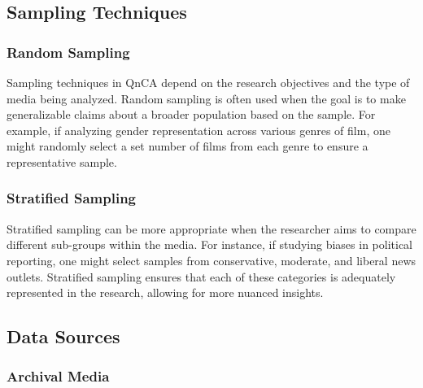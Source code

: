 \documentclass[
  b5paper]{book}
\begin{document}
\hypertarget{sampling-techniques}{%
\subsection*{Sampling Techniques}\label{sampling-techniques}}

\hypertarget{random-sampling}{%
\subsubsection*{Random Sampling}\label{random-sampling}}

Sampling techniques in QnCA depend on the research objectives and the type of media being analyzed. Random sampling is often used when the goal is to make generalizable claims about a broader population based on the sample. For example, if analyzing gender representation across various genres of film, one might randomly select a set number of films from each genre to ensure a representative sample.

\hypertarget{stratified-sampling}{%
\subsubsection*{Stratified Sampling}\label{stratified-sampling}}

Stratified sampling can be more appropriate when the researcher aims to compare different sub-groups within the media. For instance, if studying biases in political reporting, one might select samples from conservative, moderate, and liberal news outlets. Stratified sampling ensures that each of these categories is adequately represented in the research, allowing for more nuanced insights.

\hypertarget{data-sources}{%
\subsection*{Data Sources}\label{data-sources}}

\hypertarget{archival-media}{%
\subsubsection*{Archival Media}\label{archival-media}}
\end{document}
